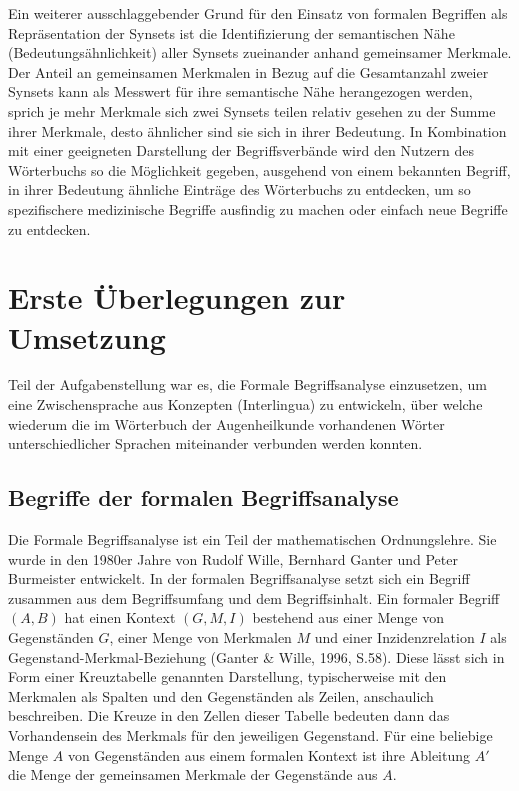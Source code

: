 \documentclass[pagesize,DIV=calc,12pt,draft]{scrreprt}
\begin{document}
Ein weiterer ausschlaggebender Grund für den Einsatz von formalen Begriffen als Repräsentation der Synsets ist die Identifizierung der semantischen Nähe (Bedeutungsähnlichkeit) aller Synsets zueinander anhand gemeinsamer Merkmale. 
Der Anteil an gemeinsamen Merkmalen in Bezug auf die Gesamtanzahl zweier Synsets kann als Messwert für ihre semantische Nähe herangezogen werden, sprich je mehr Merkmale sich zwei Synsets teilen relativ gesehen zu der Summe ihrer Merkmale, desto ähnlicher sind sie sich in ihrer Bedeutung. 
In Kombination mit einer geeigneten Darstellung der Begriffsverbände wird den Nutzern des Wörterbuchs so die Möglichkeit gegeben, ausgehend von einem bekannten Begriff, in ihrer Bedeutung ähnliche Einträge des Wörterbuchs zu entdecken, um so spezifischere medizinische Begriffe ausfindig zu machen oder einfach neue Begriffe zu entdecken. 

\section{Erste Überlegungen zur Umsetzung}

Teil der Aufgabenstellung war es, die Formale Begriffsanalyse einzusetzen, um eine Zwischensprache aus Konzepten (Interlingua) zu entwickeln, über welche wiederum die im Wörterbuch der Augenheilkunde vorhandenen Wörter unterschiedlicher Sprachen miteinander verbunden werden konnten.

\subsection{Begriffe der formalen Begriffsanalyse}
\label{subsec:marker}

Die Formale Begriffsanalyse ist ein Teil der mathematischen Ordnungslehre. 
Sie wurde in den 1980er Jahre von Rudolf Wille, Bernhard Ganter und Peter Burmeister entwickelt. 
In der formalen Begriffsanalyse setzt sich ein Begriff zusammen aus dem Begriffsumfang und dem Begriffsinhalt. 
Ein formaler Begriff $(A,B)$ hat einen Kontext $(G,M,I)$ bestehend aus einer Menge von Gegenständen $G$, einer Menge von Merkmalen $M$ und einer Inzidenzrelation $I$ als Gegenstand-Merkmal-Beziehung (Ganter \& Wille, 1996, S.58). 
Diese lässt sich in Form einer Kreuztabelle genannten Darstellung, typischerweise mit den Merkmalen als Spalten und den Gegenständen als Zeilen, anschaulich beschreiben. 
Die Kreuze in den Zellen dieser Tabelle bedeuten dann das Vorhandensein des Merkmals für den jeweiligen Gegenstand. 
Für eine beliebige Menge $A$ von Gegenständen aus einem formalen Kontext ist ihre Ableitung $A'$ die Menge der gemeinsamen Merkmale der Gegenstände aus $A$. 
\end{document}
